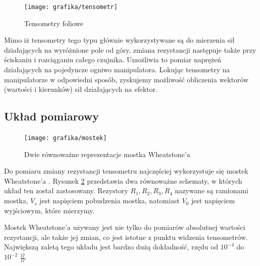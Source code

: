 \documentclass[printmode]{mgr}
\begin{document}
\begin{figure}[tp]
\centering
  \texttt{[image: grafika/tensometr]}
  \caption{Tensometry foliowe}
  \label{rys:tensometr}  
\end{figure}

Mimo iż tensometry tego typu głównie wykorzystywane są do mierzenia sił działających na wyróżnione pole od góry, zmiana rezystancji 
następuje także przy ściskaniu i rozciąganiu całego czujnika. Umożliwia to pomiar naprężeń działających na pojedyncze ogniwo
manipulatora. Lokując tensometry na manipulatorze w odpowiedni sposób, zyskujemy możliwość obliczenia wektorów (wartości i kierunków)
sił działających na efektor.

\subsection{Układ pomiarowy}
\begin{figure}[tp]
\centering
  \texttt{[image: grafika/mostek]}
  \caption{Dwie równoważne reprezentacje mostka Wheatstone'a}
  \label{rys:mostek}  
\end{figure}
Do pomiaru zmiany rezystancji tensometru najczęściej wykorzystuje się mostek Wheatstone'a \cite{tensometry}. Rysunek \ref{rys:mostek}
przedstawia dwa równoważne schematy, w których układ ten został zastosowany. Rezystory $R_1, R_2, R_3, R_4$ nazywane są ramionami mostka,
$V_s$ jest napięciem pobudzenia mostka, natomiast $V_0$ jest napięciem wyjściowym, które mierzymy.

Mostek Wheatstone'a używany jest nie tylko do pomiarów
absolutnej wartości rezystancji, ale także jej zmian, co jest istotne z punktu widzenia tensometrów. Największą zaletą
tego układu jest bardzo dużą dokładność, rzędu od $10^{-4}$ do $10^{-2}$ $\frac{\Omega}{\Omega}$.
\end{document}
